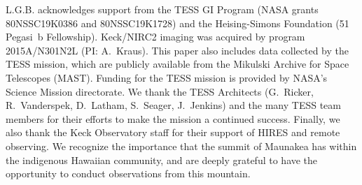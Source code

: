 \documentclass[12pt,modern,tighten]{aastex63}
\begin{document}
\acknowledgements
\raggedbottom
%
L.G.B{.} acknowledges support from the TESS GI Program (NASA grants
80NSSC19K0386 and 80NSSC19K1728) and the Heising-Simons Foundation (51 Pegasi~b
Fellowship).
%
%
Keck/NIRC2 imaging was acquired by program 2015A/N301N2L
(PI: A.~Kraus). %
%
%
This paper also includes data collected by the TESS mission, which are
publicly available from the Mikulski Archive for Space Telescopes
(MAST).
%
Funding for the TESS mission is provided by NASA's Science Mission
directorate.
%
We thank the TESS Architects (G.~Ricker, R.~Vanderspek, D.~Latham,
S.~Seager, J.~Jenkins) and the many TESS team members for their
efforts to make the mission a continued success.
%
%
%
%
Finally, we also thank the Keck Observatory staff for their support of
HIRES and remote observing.  We recognize the importance that the
summit of Maunakea has within the indigenous Hawaiian community, and
are deeply grateful to have the opportunity to conduct observations
from this mountain.
%
%


%
\end{document}

